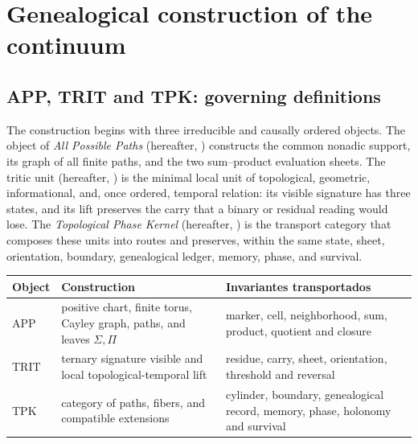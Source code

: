 \label{chap:83-03}

\section{Genealogical construction of the continuum}

\subsection{APP, TRIT and TPK: governing definitions}

The construction begins with three irreducible and causally ordered objects. The object of \emph{All Possible Paths} (hereafter, \APP) constructs the common nonadic support, its graph of all finite paths, and the two sum--product evaluation sheets. The tritic unit (hereafter, \TRIT) is the minimal local unit of topological, geometric, informational, and, once ordered, temporal relation: its visible signature has three states, and its lift preserves the carry that a binary or residual reading would lose. The \emph{Topological Phase Kernel} (hereafter, \TPK) is the transport category that composes these units into routes and preserves, within the same state, sheet, orientation, boundary, genealogical ledger, memory, phase, and survival.

\begin{center}
\begin{tabularx}{.94\textwidth}{@{}p{}Y Y@{}}
\toprule
Object & Construction & Invariantes transportados\\
\midrule
APP & positive chart, finite torus, Cayley graph, paths, and leaves
\(\Sigma,\Pi\) & marker, cell, neighborhood, sum, product, quotient and closure\\
TRIT & ternary signature visible and local topological-temporal lift &
residue, carry, sheet, orientation, threshold and reversal\\
TPK & category of paths, fibers, and compatible extensions & cylinder,  
boundary, genealogical record, memory, phase, holonomy and survival\\
\bottomrule
\end{tabularx}
\end{center}

